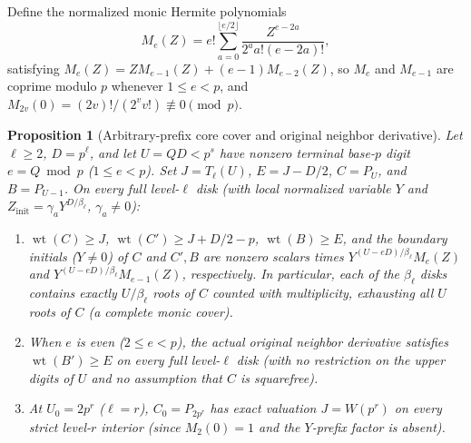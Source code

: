 \documentclass[11pt,reqno]{amsart}
\numberwithin{equation}{section}
\newtheorem{proposition}[theorem]{Proposition}
\theoremstyle{definition}
\theoremstyle{remark}
\newcommand{\wt}{\operatorname{wt}}
\begin{document}
Define the normalized monic Hermite polynomials
\begin{equation}
\label{eq:Me-def}
M_e(Z) = e!\sum_{a=0}^{\lfloor e/2\rfloor} \frac{Z^{e-2a}}{2^a a!(e-2a)!},
\end{equation}
satisfying $M_e(Z) = Z M_{e-1}(Z) + (e-1)M_{e-2}(Z)$, so $M_e$ and $M_{e-1}$ are coprime modulo $p$ whenever $1\le e < p$, and $M_{2v}(0) = (2v)!/(2^v v!)\not\equiv 0\pmod p$.

\begin{proposition}[Arbitrary-prefix core cover and original neighbor derivative]
\label{prop:prefix-cover}
Let $\ell\ge 2$, $D=p^\ell$, and let $U = QD < p^s$ have nonzero terminal base-$p$ digit $e = Q\bmod p$ ($1\le e<p$). Set $J = T_\ell(U)$, $E = J - D/2$, $C = P_U$, and $B = P_{U-1}$. On every full level-$\ell$ disk (with local normalized variable $Y$ and $Z_{\mathrm{init}} = \gamma_a Y^{D/\beta_\ell}$, $\gamma_a\ne 0$):
\begin{enumerate}[label=(\alph*),leftmargin=2em]
\item $\wt(C)\ge J$, $\wt(C')\ge J+D/2-p$, $\wt(B)\ge E$, and the boundary initials ($Y\ne 0$) of $C$ and $C',B$ are nonzero scalars times $Y^{(U-eD)/\beta_\ell}M_e(Z)$ and $Y^{(U-eD)/\beta_\ell}M_{e-1}(Z)$, respectively. In particular, each of the $\beta_\ell$ disks contains exactly $U/\beta_\ell$ roots of $C$ counted with multiplicity, exhausting all $U$ roots of $C$ (a complete monic cover).
\item When $e$ is even ($2\le e<p$), the actual original neighbor derivative satisfies $\wt(B')\ge E$ on every full level-$\ell$ disk (with no restriction on the upper digits of $U$ and no assumption that $C$ is squarefree).
\item At $U_0 = 2p^r$ ($\ell=r$), $C_0 = P_{2p^r}$ has exact valuation $J=W(p^r)$ on every strict level-$r$ interior (since $M_2(0)=1$ and the $Y$-prefix factor is absent).
\end{enumerate}
\end{proposition}
\end{document}
